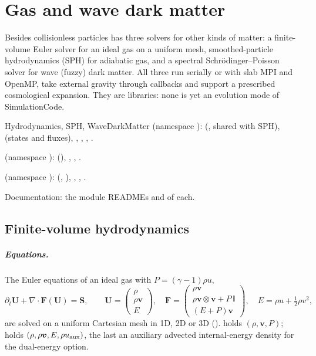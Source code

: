 \chapter{Gas and wave dark matter}\label{ch:hydro-wavedm}

Besides collisionless particles \fml{} has three solvers for other kinds of matter: a finite-volume Euler solver for
an ideal gas on a uniform mesh, smoothed-particle hydrodynamics (SPH) for adiabatic gas, and a spectral
Schr\"odinger--Poisson solver for wave (fuzzy) dark matter. All three run serially or with slab MPI and OpenMP, take
external gravity through callbacks and support a prescribed cosmological expansion. They are libraries: none is yet
an evolution mode of SimulationCode.

\begin{modulebox}{Hydrodynamics, SPH, WaveDarkMatter}
 (namespace ):  (, shared with SPH),
 (states and fluxes), , , ,
.\par
{} (namespace ):  (), , , .\par
{} (namespace ):  (, ),
, , .\par
Documentation: the module READMEs and  of each.
\end{modulebox}

\section{Finite-volume hydrodynamics}\label{sec:hydro-fv}

\paragraph*{Equations.} The Euler equations of an ideal gas with $P=(\gamma-1)\rho u$,
\begin{equation}
\partial_t\bm U+\nabla\cdot\bm F(\bm U)=\bm S,\qquad
\bm U=\begin{pmatrix}\rho\\ \rho\bm v\\ E\end{pmatrix},\quad
\bm F=\begin{pmatrix}\rho\bm v\\ \rho\bm v\otimes\bm v+P\,\mathbb I\\ (E+P)\bm v\end{pmatrix},\quad
E=\rho u+\tfrac12\rho v^2,
\end{equation}
are solved on a uniform Cartesian mesh in 1D, 2D or 3D ().  holds
$(\rho,\bm v,P)$;  holds $(\rho,\rho\bm v,E,\rho u_{\rm aux})$, the last an auxiliary advected
internal-energy density for the dual-energy option.


